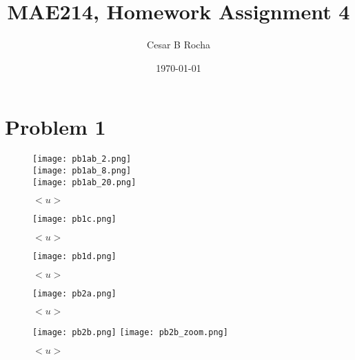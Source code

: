\documentclass[11pt]{article}
\title{MAE214, Homework Assignment 4}
\author{Cesar B Rocha}
\date{\today}
\begin{document}


\maketitle

\section*{Problem 1}


\begin{figure}[ht]
\begin{center}
\texttt{[image: pb1ab\_2.png]}\\
\texttt{[image: pb1ab\_8.png]}\\
\texttt{[image: pb1ab\_20.png]}
\end{center}
\caption{$<u>$}
\label{fig:the_velocity}
\end{figure}

\begin{figure}[ht]
\begin{center}
\texttt{[image: pb1c.png]}\\
\end{center}
\caption{$<u>$}
\label{fig:the_mean_velocity}
\end{figure}

\begin{figure}[ht]
\begin{center}
\texttt{[image: pb1d.png]}\\
\end{center}
\caption{$<u>$}
\label{fig:the_mean_velocity2}
\end{figure}

\begin{figure}[ht]
\begin{center}
\texttt{[image: pb2a.png]}\\
\end{center}
\caption{$<u>$}
\label{fig:stress}
\end{figure}

\begin{figure}[ht]
\begin{center}
\texttt{[image: pb2b.png]}
\texttt{[image: pb2b\_zoom.png]}
\end{center}
\caption{$<u>$}
\label{fig:stress2}
\end{figure}
\end{document}
